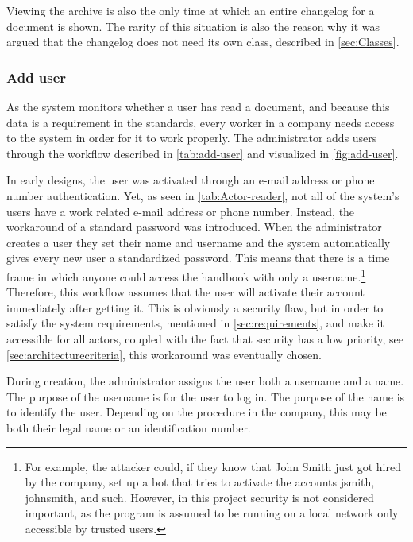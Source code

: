 Viewing the archive is also the only time at which an entire changelog for a document is shown.
The rarity of this situation is also the reason why it was argued that the changelog does not need its own class, described in \cref{sec:Classes}.

\subsubsection{Add user}
As the system monitors whether a user has read a document, and because this data is a requirement in the standards, every worker in a company needs access to the system in order for it to work properly.
The administrator adds users through the workflow described in \cref{tab:add-user} and visualized in \cref{fig:add-user}.




In early designs, the user was activated through an e-mail address or phone number authentication.
Yet, as seen in \cref{tab:Actor-reader}, not all of the system's users have a work related e-mail address or phone number.
Instead, the workaround of a standard password was introduced.
When the administrator creates a user they set their name and username and the system automatically gives every new user a standardized password.
This means that there is a time frame in which anyone could access the handbook with only a username.\footnote{For example, the attacker could, if they know that John Smith just got hired by the company, set up a bot that tries to activate the accounts jsmith, johnsmith, and such. However, in this project security is not considered important, as the program is assumed to be running on a local network only accessible by trusted users.}
Therefore, this workflow assumes that the user will activate their account immediately after getting it.
This is obviously a security flaw, but in order to satisfy the system requirements, mentioned in \cref{sec:requirements}, and make it accessible for all actors, coupled with the fact that security has a low priority, see \cref{sec:architecturecriteria}, this workaround was eventually chosen.

During creation, the administrator assigns the user both a username and a name.
The purpose of the username is for the user to log in.
The purpose of the name is to identify the user.
Depending on the procedure in the company, this may be both their legal name or an identification number.

